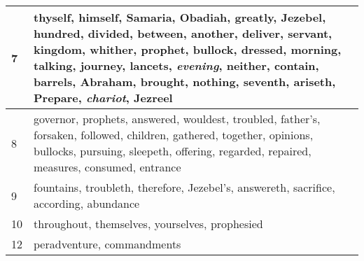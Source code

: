 \begin{center}
\begin{longtable}{l|p{3.75in}}
7 & thyself, himself, Samaria, Obadiah, greatly, Jezebel, hundred, divided, between, another, deliver, servant, kingdom, whither, prophet, bullock, dressed, morning, talking, journey, lancets, \emph{evening}, neither, contain, barrels, Abraham, brought, nothing, seventh, ariseth, Prepare, \emph{chariot}, Jezreel\\ \hline 
8 & governor, prophets, answered, wouldest, troubled, father's, forsaken, followed, children, gathered, together, opinions, bullocks, pursuing, sleepeth, offering, regarded, repaired, measures, consumed, entrance\\ \hline 
9 & fountains, troubleth, therefore, Jezebel's, answereth, sacrifice, according, abundance\\ \hline 
10 & throughout, themselves, yourselves, prophesied\\ \hline 
12 & peradventure, commandments\\ \hline 
\end{longtable}
\end{center}





